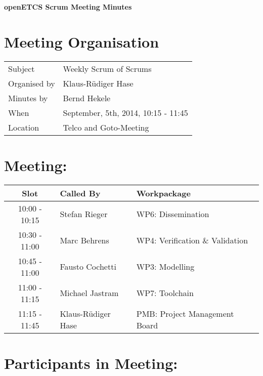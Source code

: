 \documentclass[a4paper, 11pt]{article}
\begin{document}
{\begin{center}\huge\bf openETCS Scrum Meeting Minutes\end{center}}
\section{Meeting Organisation}

\renewcommand{\arraystretch}{1.5}
\begin{supertabular}{m{.2\textwidth}m{.8\textwidth}}
Subject & Weekly Scrum of Scrums\\
Organised by &Klaus-R\"udiger Hase\\
Minutes by & Bernd Hekele\\
When & September, 5th, 2014, 10:15 - 11:45\\
Location & Telco and Goto-Meeting\\
\end{supertabular}

\renewcommand{\arraystretch}{1.0}
\section{Meeting:}

\begin{tabular}{|c|l|l|}
\hline
\textbf{Slot} &  \textbf{Called By} & \textbf{Workpackage} \\
\hline  
10:00 - 10:15 & Stefan Rieger & WP6: Dissemination \\\hline  
10:30 - 11:00 & Marc Behrens & WP4: Verification \& Validation \\\hline  
10:45 - 11:00 & Fausto Cochetti & WP3: Modelling \\\hline  
11:00 - 11:15 & Michael Jastram & WP7: Toolchain \\\hline
11:15 - 11:45 & Klaus-R\"udiger Hase & PMB: Project Management Board \\\hline  
\end{tabular}

\section{Participants in Meeting:}
\end{document}
